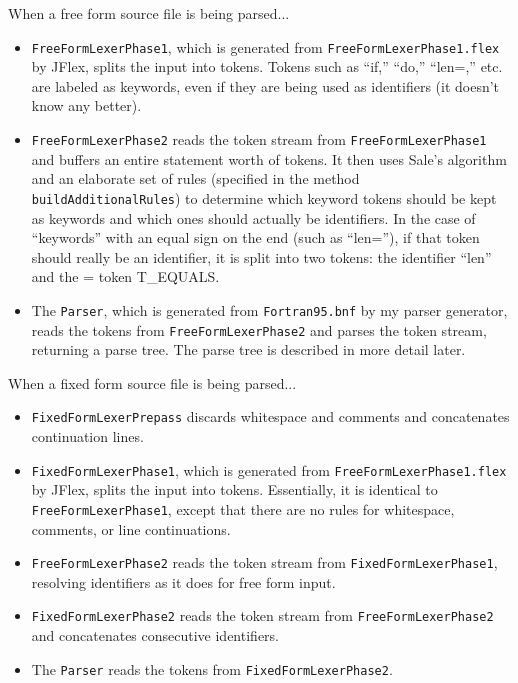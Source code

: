 When a free form source file is being parsed...
\begin{itemize}

\item \texttt{FreeFormLexerPhase1}, which is generated from
\texttt{FreeFormLexerPhase1.flex} by JFlex, splits the input into tokens.
Tokens such as ``if,'' ``do,'' ``len=,'' etc. are labeled as keywords,
even if they are being used as identifiers (it doesn't know any better).

\item \texttt{FreeFormLexerPhase2} reads the token stream from
\texttt{FreeFormLexerPhase1} and buffers an entire statement worth of
tokens.  It then uses Sale's algorithm and an elaborate set of rules
(specified in the method \texttt{buildAdditionalRules}) to determine which
keyword tokens should be kept as keywords and which ones should actually
be identifiers.  In the case of ``keywords'' with an equal sign on the end
(such as ``len=''), if that token should really be an identifier, it is
split into two tokens: the identifier ``len'' and the = token T\_EQUALS.

\item The \texttt{Parser}, which is generated from \texttt{Fortran95.bnf}
by my parser generator, reads the tokens from \texttt{FreeFormLexerPhase2}
and parses the token stream, returning a parse tree.  The parse tree is
described in more detail later.

\end{itemize}

When a fixed form source file is being parsed...
\begin{itemize}

\item \texttt{FixedFormLexerPrepass} discards whitespace and comments
and concatenates continuation lines.

\item \texttt{FixedFormLexerPhase1}, which is generated from
\texttt{FreeFormLexerPhase1.flex} by JFlex, splits the input into tokens.
Essentially, it is identical to \texttt{FreeFormLexerPhase1}, except that
there are no rules for whitespace, comments, or line continuations.

\item \texttt{FreeFormLexerPhase2} reads the token stream from
\texttt{FixedFormLexerPhase1}, resolving identifiers as it does for free form
input.

\item \texttt{FixedFormLexerPhase2} reads the token stream from
\texttt{FreeFormLexerPhase2} and concatenates consecutive identifiers.

\item The \texttt{Parser} reads the tokens from \texttt{FixedFormLexerPhase2}.

\end{itemize}

